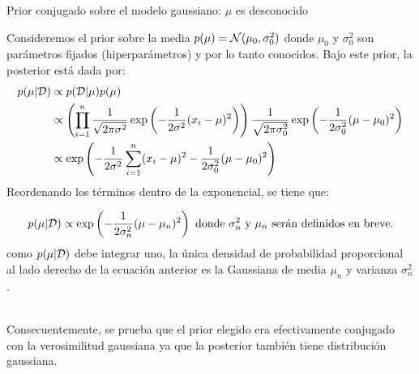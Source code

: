 \documentclass[9pt, handout]{beamer}
\begin{document}
\begin{frame}{Prior conjugado sobre el modelo gaussiano: $\mu$ es desconocido}

Consideremos el prior sobre la media $p(\mu) = {\mathcal N}(\mu_0,\sigma_0^2)$ donde $\mu_0$ y $\sigma^2_0$ son parámetros fijados (hiperparámetros) y por lo tanto conocidos. Bajo este prior, la posterior está dada por:
 \begin{align*}
 	p(\mu|{\mathcal D})& \propto p({\mathcal D}|\mu)p(\mu)\\
 	& \propto \left(\prod_{i=1}^n \frac{1}{\sqrt{2\pi\sigma^2}}\exp\left(-\frac{1}{2\sigma^2}(x_i-\mu)^2\right) \right)\frac{1}{\sqrt{2\pi\sigma_0^2}}\exp\left(-\frac{1}{2\sigma_0^2}(\mu-\mu_0)^2\right)\\
 	&\propto \exp\left(-\frac{1}{2\sigma^2}\sum_{i=1}^n(x_i-\mu)^2-\frac{1}{2\sigma_0^2}(\mu-\mu_0)^2\right)
 \end{align*} 
 \pause
 Reordenando los términos dentro de la exponencial, se tiene que:
 
 \begin{equation*}
 	p(\mu|{\mathcal D}) \propto \exp\left(-\frac{1}{2\sigma_n^2}(\mu - \mu_n)^2\right) \text{ donde $\sigma_n^2$ y $\mu_n$ serán definidos en breve.}
 	\end{equation*} 
\pause
como $p(\mu|{\mathcal D})$ debe integrar uno, la única densidad de probabilidad proporcional al lado derecho de la ecuación anterior es la Gaussiana de media $\mu_n$ y varianza $\sigma_n^2$.\\~\ \pause

Consecuentemente, se prueba que el prior elegido era efectivamente conjugado con la verosimilitud gaussiana ya que la posterior también tiene distribución gaussiana.

\end{frame}
\end{document}
